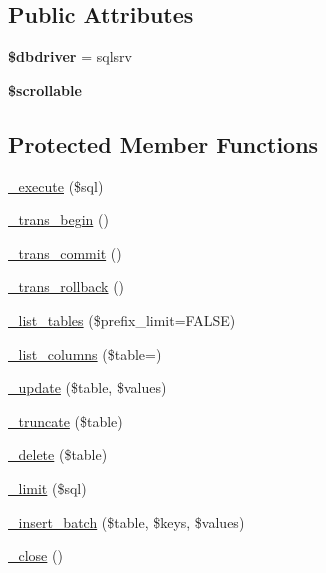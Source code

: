 \subsection*{Public Attributes}
\begin{DoxyCompactItemize}
\item 
\mbox{\label{class_c_i___d_b__sqlsrv__driver_ab92b845a9c49f26a9dfae4c612072605}} 
{\bfseries \$dbdriver} = \textquotesingle{}sqlsrv\textquotesingle{}
\item 
\mbox{\label{class_c_i___d_b__sqlsrv__driver_a3b6465899c779f8f8425e0b454a104c7}} 
{\bfseries \$scrollable}
\end{DoxyCompactItemize}
\subsection*{Protected Member Functions}
\begin{DoxyCompactItemize}
\item 
\mbox{\hyperlink{class_c_i___d_b__sqlsrv__driver_a76251a312de1703ffc30f1691a4a2061}{\+\_\+execute}} (\$sql)
\item 
\mbox{\hyperlink{class_c_i___d_b__sqlsrv__driver_a713f75fcd91fc14da1b43f375c2c0105}{\+\_\+trans\+\_\+begin}} ()
\item 
\mbox{\hyperlink{class_c_i___d_b__sqlsrv__driver_ae447ca34cd0deb2b1390531ca683848e}{\+\_\+trans\+\_\+commit}} ()
\item 
\mbox{\hyperlink{class_c_i___d_b__sqlsrv__driver_a0040c671bce140b07312b769d7e5211b}{\+\_\+trans\+\_\+rollback}} ()
\item 
\mbox{\hyperlink{class_c_i___d_b__sqlsrv__driver_a77feb46ae9982dad8d0eeea98c20c69c}{\+\_\+list\+\_\+tables}} (\$prefix\+\_\+limit=F\+A\+L\+SE)
\item 
\mbox{\hyperlink{class_c_i___d_b__sqlsrv__driver_adbc13aa538ae09cbb35b0600772bc2eb}{\+\_\+list\+\_\+columns}} (\$table=\textquotesingle{}\textquotesingle{})
\item 
\mbox{\hyperlink{class_c_i___d_b__sqlsrv__driver_a695285cd7c6473974b1441a8d051f998}{\+\_\+update}} (\$table, \$values)
\item 
\mbox{\hyperlink{class_c_i___d_b__sqlsrv__driver_a275168d69dc62a8ba103b1a9bf2ffa62}{\+\_\+truncate}} (\$table)
\item 
\mbox{\hyperlink{class_c_i___d_b__sqlsrv__driver_a4834727118b44d74ee9aab4a9604dcb9}{\+\_\+delete}} (\$table)
\item 
\mbox{\hyperlink{class_c_i___d_b__sqlsrv__driver_ab75120b46f50c22eaac8a39c4e82ae3b}{\+\_\+limit}} (\$sql)
\item 
\mbox{\hyperlink{class_c_i___d_b__sqlsrv__driver_aa8765e8fe2cd7cc51370f84868f98626}{\+\_\+insert\+\_\+batch}} (\$table, \$keys, \$values)
\item 
\mbox{\hyperlink{class_c_i___d_b__sqlsrv__driver_ac8eac17ec2b2144d4bdc89390dad84e0}{\+\_\+close}} ()
\end{DoxyCompactItemize}
